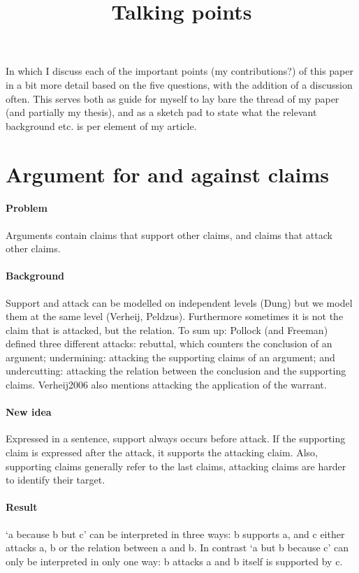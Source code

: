 \documentclass{article}
\let\stdsection\section
\renewcommand\section{\newpage\stdsection}
\begin{document}
\title{Talking points}
\maketitle{}
In which I discuss each of the important points (my contributions?) of this paper in a bit more detail based on the five questions, with the addition of a discussion often. This serves both as guide for myself to lay bare the thread of my paper (and partially my thesis), and as a sketch pad to state what the relevant background etc. is per element of my article.

\section{Argument for and against claims}

\paragraph{Problem} Arguments contain claims that support other claims, and claims that attack other claims.
\paragraph{Background} Support and attack can be modelled on independent levels (Dung) but we model them at the same level (Verheij, Peldzus). Furthermore sometimes it is not the claim that is attacked, but the relation. To sum up: Pollock (and Freeman) defined three different attacks: rebuttal, which counters the conclusion of an argunent; undermining: attacking the supporting claims of an argument; and undercutting: attacking the relation between the conclusion and the supporting claims. Verheij2006 also mentions attacking the application of the warrant.
\paragraph{New idea} Expressed in a sentence, support always occurs before attack. If the supporting claim is expressed after the attack, it supports the attacking claim. Also, supporting claims generally refer to the last claims, attacking claims are harder to identify their target.
\paragraph{Result} `a because b but c' can be interpreted in three ways: b supports a, and c either attacks a, b or the relation between a and b. In contrast `a but b because c' can only be interpreted in only one way: b attacks a and b itself is supported by c.
\end{document}

